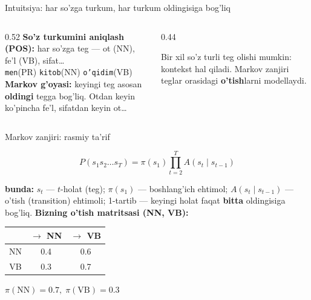 \documentclass[aspectratio=169,11pt]{beamer}
\newcommand{\bunda}[1]{{\small\textbf{bunda:}\; #1}}
\begin{document}
\begin{frame}{Intuitsiya: har so'zga turkum, har turkum oldingisiga bog'liq}
  \begin{columns}[T]
    \begin{column}{0.52\textwidth}
      \small
      \textbf{So'z turkumini aniqlash (POS):} har so'zga teg --- ot (NN),
      fe'l (VB), sifat\ldots\\[4pt]
      \texttt{men}(PR) \; \texttt{kitob}(NN) \; \texttt{o'qidim}(VB)\\[6pt]
      \textbf{Markov g'oyasi:} keyingi teg asosan \textbf{oldingi}
      tegga bog'liq. Otdan keyin ko'pincha fe'l, sifatdan keyin ot\ldots
    \end{column}
    \begin{column}{0.44\textwidth}
      \begin{tcolorbox}[okbox,top=2pt,bottom=2pt]
        \footnotesize
        Bir xil so'z turli teg olishi mumkin: kontekst hal qiladi.
        Markov zanjiri teglar orasidagi \textbf{o'tish}larni modellaydi.
      \end{tcolorbox}
    \end{column}
  \end{columns}
\end{frame}

\begin{frame}{Markov zanjiri: rasmiy ta'rif}
  \begin{tcolorbox}[defbox,title=Ta'rif: 1-tartibli Markov zanjiri]
    \vspace{-0.4em}
    $$ P(s_1 s_2 \ldots s_T) = \pi(s_1)\prod_{t=2}^{T} A(s_t \mid s_{t-1}) $$
  \end{tcolorbox}
  \vspace{3pt}
  \bunda{$s_t$ --- $t$-holat (teg); $\pi(s_1)$ --- boshlang'ich ehtimol;
  $A(s_t\mid s_{t-1})$ --- o'tish (transition) ehtimoli; 1-tartib --- keyingi
  holat faqat \textbf{bitta} oldingisiga bog'liq.}
  \vspace{5pt}
  \textbf{Bizning o'tish matritsasi (NN, VB):}
  \begin{center}\small
  \begin{tabular}{c|cc}
     & $\to$ NN & $\to$ VB \\
    \hline
    NN & 0.4 & 0.6 \\
    VB & 0.3 & 0.7 \\
  \end{tabular}\qquad $\pi(\text{NN})=0.7,\;\pi(\text{VB})=0.3$
  \end{center}
\end{frame}
\end{document}
